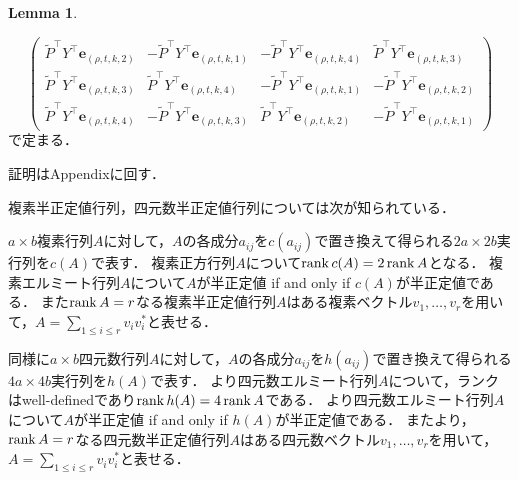 \documentclass[11pt]{article}
\theoremstyle{definition}
\newtheorem{lemma}[defi]{Lemma}
\begin{document}
\begin{lemma}
\begin{itemize}
\[\begin{pmatrix}
                    \tilde{P}^\top Y^\top \bm{e}_{(\rho,t,k,2)} &-\tilde{P}^\top Y^\top \bm{e}_{(\rho,t,k,1)} &-\tilde{P}^\top Y^\top \bm{e}_{(\rho,t,k,4)} & \tilde{P}^\top Y^\top \bm{e}_{(\rho,t,k,3)} \\
                    \tilde{P}^\top Y^\top \bm{e}_{(\rho,t,k,3)} & \tilde{P}^\top Y^\top \bm{e}_{(\rho,t,k,4)} &-\tilde{P}^\top Y^\top \bm{e}_{(\rho,t,k,1)} &-\tilde{P}^\top Y^\top \bm{e}_{(\rho,t,k,2)} \\
                    \tilde{P}^\top Y^\top \bm{e}_{(\rho,t,k,4)} & -\tilde{P}^\top Y^\top \bm{e}_{(\rho,t,k,3)} & \tilde{P}^\top Y^\top \bm{e}_{(\rho,t,k,2)} &-\tilde{P}^\top Y^\top \bm{e}_{(\rho,t,k,1)}
                \end{pmatrix}
            \]
            で定まる．  
        \end{itemize}
    \end{lemma}
    証明はAppendixに回す．

    複素半正定値行列，四元数半正定値行列については次が知られている．
    
    $a \times b$複素行列$A$に対して，$A$の各成分$a_{ij}$を$c(a_{ij})$で置き換えて得られる$2a \times 2b$実行列を$c(A)$で表す．
    複素正方行列$A$について$\rank c(A) = 2\rank A$となる．
    複素エルミート行列$A$について$A$が半正定値 if and only if $c(A)$が半正定値である．
    また$\rank A =r$なる複素半正定値行列$A$はある複素ベクトル$v_1, \ldots, v_r$を用いて，$A=\sum_{1\leq i\leq r} v_i v_i^*$と表せる．
    
    同様に$a \times b$四元数行列$A$に対して，$A$の各成分$a_{ij}$を$h(a_{ij})$で置き換えて得られる$4a \times 4b$実行列を$h(A)$で表す．
    \cite[Theorem~7.3]{zhang1997quaternions}より四元数エルミート行列$A$について，ランクはwell-definedであり$\rank h(A) = 4\rank A$である．
    \cite[Remark~6.1]{zhang1997quaternions}より四元数エルミート行列$A$について$A$が半正定値 if and only if $h(A)$が半正定値である．
    また\cite[Corollary~6.2]{zhang1997quaternions}より，
    $\rank A =r$なる四元数半正定値行列$A$はある四元数ベクトル$v_1, \ldots, v_r$を用いて，$A=\sum_{1\leq i\leq r} v_i v_i^*$と表せる．
    
\end{document}

